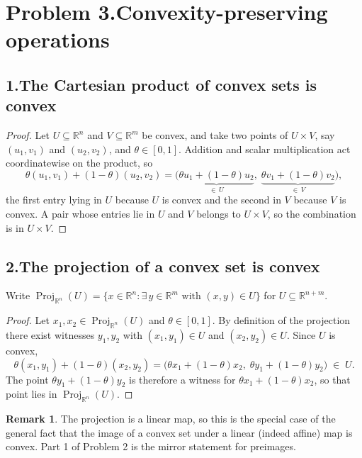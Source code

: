 \documentclass[11pt]{article}
\DeclareMathOperator{\Proj}{Proj}
\theoremstyle{definition}
\newtheorem{remark}{Remark}
\theoremstyle{plain}
\begin{document}
\section*{Problem 3.\quad Convexity-preserving operations \quad[10 pts]}

\subsection*{1.\quad The Cartesian product of convex sets is convex}

\begin{proof}
Let $U \subseteq \mathbb{R}^{n}$ and $V \subseteq \mathbb{R}^{m}$ be
convex, and take two points of $U \times V$, say $(u_1, v_1)$ and
$(u_2, v_2)$, and $\theta \in [0,1]$. Addition and scalar
multiplication act coordinatewise on the product, so
\[
  \theta (u_1, v_1) + (1-\theta)(u_2, v_2)
  = \Big( \underbrace{\theta u_1 + (1-\theta) u_2}_{\in\, U},\;
          \underbrace{\theta v_1 + (1-\theta) v_2}_{\in\, V} \Big),
\]
the first entry lying in $U$ because $U$ is convex and the second in $V$
because $V$ is convex. A pair whose entries lie in $U$ and $V$ belongs
to $U \times V$, so the combination is in $U \times V$.
\end{proof}

\subsection*{2.\quad The projection of a convex set is convex}

Write $\Proj_{\mathbb{R}^n}(U)
= \{ x \in \mathbb{R}^n : \exists\, y \in \mathbb{R}^m
  \text{ with } (x,y) \in U \}$ for
$U \subseteq \mathbb{R}^{n+m}$.

\begin{proof}
Let $x_1, x_2 \in \Proj_{\mathbb{R}^n}(U)$ and $\theta \in [0,1]$. By
definition of the projection there exist witnesses $y_1, y_2$ with
$(x_1, y_1) \in U$ and $(x_2, y_2) \in U$. Since $U$ is convex,
\[
  \theta (x_1, y_1) + (1-\theta)(x_2, y_2)
  = \big( \theta x_1 + (1-\theta) x_2,\;
          \theta y_1 + (1-\theta) y_2 \big) \;\in\; U .
\]
The point $\theta y_1 + (1-\theta) y_2$ is therefore a witness for
$\theta x_1 + (1-\theta) x_2$, so that point lies in
$\Proj_{\mathbb{R}^n}(U)$.
\end{proof}

\begin{remark}
The projection is a linear map, so this is the special case of the
general fact that the image of a convex set under a linear (indeed
affine) map is convex. Part 1 of Problem 2 is the mirror statement for
preimages.
\end{remark}
\end{document}
